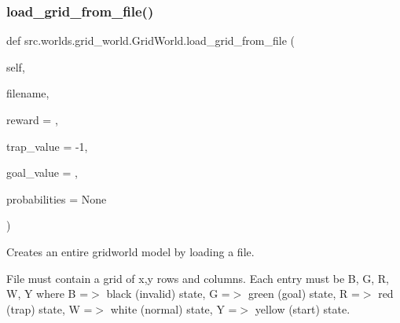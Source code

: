 \subsubsection{\texorpdfstring{load\+\_\+grid\+\_\+from\+\_\+file()}{load\_grid\_from\_file()}}
{\footnotesize\ttfamily def src.\+worlds.\+grid\+\_\+world.\+Grid\+World.\+load\+\_\+grid\+\_\+from\+\_\+file (\begin{DoxyParamCaption}\item[{}]{self,  }\item[{}]{filename,  }\item[{}]{reward = {},  }\item[{}]{trap\+\_\+value = {\ttfamily -\/1},  }\item[{}]{goal\+\_\+value = {},  }\item[{}]{probabilities = {\ttfamily None} }\end{DoxyParamCaption})}



Creates an entire gridworld model by loading a file. 

File must contain a grid of x,y rows and columns. Each entry must be \textquotesingle{}B\textquotesingle{}, \textquotesingle{}G\textquotesingle{}, \textquotesingle{}R\textquotesingle{}, \textquotesingle{}W\textquotesingle{}, \textquotesingle{}Y\textquotesingle{} where \textquotesingle{}B\textquotesingle{} =$>$ black (invalid) state, \textquotesingle{}G\textquotesingle{} =$>$ green (goal) state, \textquotesingle{}R\textquotesingle{} =$>$ red (trap) state, \textquotesingle{}W\textquotesingle{} =$>$ white (normal) state, \textquotesingle{}Y\textquotesingle{} =$>$ yellow (start) state.


